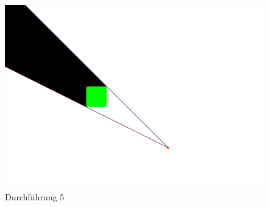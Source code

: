 \documentclass[10pt,twocolumn]{scrartcl}
\begin{document}
\begin{figure}[H]
	\centering
	\includegraphics[width=\columnwidth]{images/durchfuehrung_4.png}
	\caption{Durchführung 5}
	\label{durch5}
\end{figure}
\end{document}
